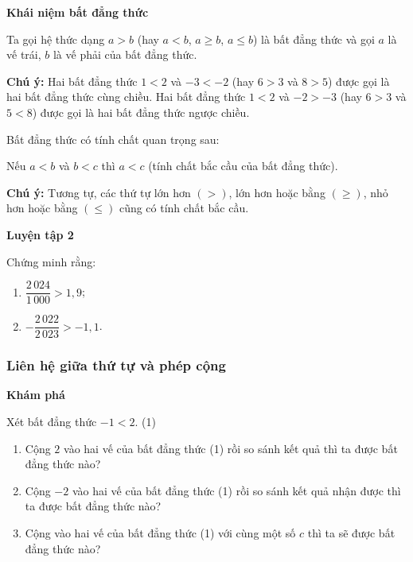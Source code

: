 \begin{lesson}
    \textbf{Khái niệm bất đẳng thức}

    \begin{keyconcept}
        Ta gọi hệ thức dạng $a>b$ (hay $a<b$, $a\ge b$, $a\le b$) là bất đẳng thức và gọi $a$ là vế trái, $b$ là vế phải của bất đẳng thức.
    \end{keyconcept}

    \textbf{Chú ý:} Hai bất đẳng thức $1<2$ và $-3<-2$ (hay $6>3$ và $8>5$) được gọi là hai bất đẳng thức cùng chiều. Hai bất đẳng thức $1<2$ và $-2>-3$ (hay $6>3$ và $5<8$) được gọi là hai bất đẳng thức ngược chiều.

    \begin{keyconcept}
        Bất đẳng thức có tính chất quan trọng sau:

        Nếu $a<b$ và $b<c$ thì $a<c$ (tính chất bắc cầu của bất đẳng thức).
    \end{keyconcept}

    \textbf{Chú ý:} Tương tự, các thứ tự lớn hơn $(>)$, lớn hơn hoặc bằng $(\ge)$, nhỏ hơn hoặc bằng $(\le)$ cũng có tính chất bắc cầu.

    \textbf{Luyện tập 2}

    Chứng minh rằng:
    \begin{enumerate}[label=\alph*)]
        \item $\dfrac{2\,024}{1\,000}>1{,}9$;

        \answerline
        \item $-\dfrac{2\,022}{2\,023}>-1{,}1$.

        \answerline
    \end{enumerate}

    \subsubsection{Liên hệ giữa thứ tự và phép cộng}

    \textbf{Khám phá}

    Xét bất đẳng thức $-1<2$. \hfill (1)
    \begin{enumerate}[label=\alph*)]
        \item Cộng $2$ vào hai vế của bất đẳng thức (1) rồi so sánh kết quả thì ta được bất đẳng thức nào?

        \answerline
        \item Cộng $-2$ vào hai vế của bất đẳng thức (1) rồi so sánh kết quả nhận được thì ta được bất đẳng thức nào?

        \answerline
        \item Cộng vào hai vế của bất đẳng thức (1) với cùng một số $c$ thì ta sẽ được bất đẳng thức nào?


\end{enumerate}
\end{lesson}
